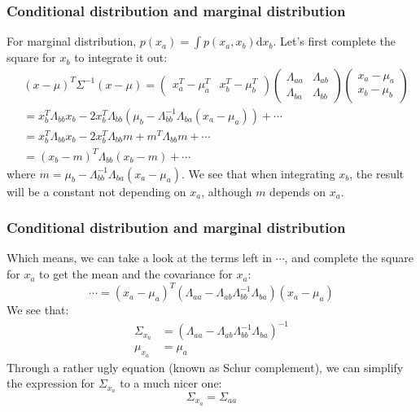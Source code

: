 \documentclass{beamer}
\begin{document}
\begin{frame}
    \frametitle{Conditional distribution and marginal distribution}
    For marginal distribution, $p(x_{a})=\int{}p(x_{a},x_{b})\mathrm{d}x_{b}$. Let's first complete the square for $x_{b}$ to integrate it out:
    \begin{align*}
        &(x-\mu)^{T}\Sigma^{-1}(x-\mu)=\begin{pmatrix}
            x_{a}^{T}-\mu_{a}^{T}&x_{b}^{T}-\mu_{b}^{T}
        \end{pmatrix}
        \begin{pmatrix}
            \Lambda_{aa}&\Lambda_{ab} \\
            \Lambda_{ba}&\Lambda_{bb}
        \end{pmatrix}
        \begin{pmatrix}
            x_{a}-\mu_{a} \\
            x_{b}-\mu_{b}
        \end{pmatrix} \\
        &=x_{b}^{T}\Lambda_{bb}x_{b}-2x_{b}^{T}\Lambda_{bb}(\mu_{b}-\Lambda_{bb}^{-1}\Lambda_{ba}(x_{a}-\mu_{a}))+\cdots \\
        &=x_{b}^{T}\Lambda_{bb}x_{b}-2x_{b}^{T}\Lambda_{bb}m+m^{T}\Lambda_{bb}m+\cdots \\
        &=(x_{b}-m)^{T}\Lambda_{bb}(x_{b}-m)+\cdots
    \end{align*}
    where $m=\mu_{b}-\Lambda_{bb}^{-1}\Lambda_{ba}(x_{a}-\mu_{a})$. We see that when integrating $x_{b}$, the result will be a constant not depending on $x_{a}$, although $m$ depends on $x_{a}$.
\end{frame}

\begin{frame}
    \frametitle{Conditional distribution and marginal distribution}
    Which means, we can take a look at the terms left in $\cdots$, and complete the square for $x_{a}$ to get the mean and the covariance for $x_{a}$:
    \begin{equation*}
        \cdots=(x_{a}-\mu_{a})^{T}(\Lambda_{aa}-\Lambda_{ab}\Lambda_{bb}^{-1}\Lambda_{ba})(x_{a}-\mu_{a})
    \end{equation*}
    We see that:
    \begin{align*}
        \Sigma_{x_{a}}&=(\Lambda_{aa}-\Lambda_{ab}\Lambda_{bb}^{-1}\Lambda_{ba})^{-1} \\
        \mu_{x_{a}}&=\mu_{a}
    \end{align*}
    Through a rather ugly equation (known as Schur complement), we can simplify the expression for $\Sigma_{x_{a}}$ to a much nicer one:
    \begin{equation*}
        \Sigma_{x_{a}}=\Sigma_{aa}
    \end{equation*}
\end{frame}
\end{document}
